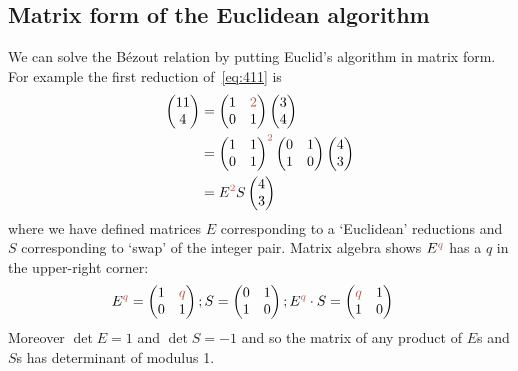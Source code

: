 \subsection{Matrix form of the Euclidean algorithm}
%
We can solve the B\'ezout relation by putting  Euclid's algorithm in matrix form. For example
the first reduction of~\eqref{eq:411} is
\begin{align*}
\begin{pmatrix} 11 \\ 4 \end{pmatrix}  &= \begin{pmatrix} 1 & \jqn{2} \\ 0 & 1\end{pmatrix} \begin{pmatrix} 3 \\ 4\end{pmatrix} 
\\
&
= \begin{pmatrix} 1 &1 \\ 0 & 1\end{pmatrix}^{\jqn{2}}  \begin{pmatrix} 0 & 1  \\ 1 & 0  \end{pmatrix} \begin{pmatrix} 4 \\ 3 \end{pmatrix}
\\
&=
E^{\jqn{2}} S \begin{pmatrix} 4 \\ 3 \end{pmatrix}
\end{align*}
where we have defined matrices  $E$ corresponding to a  `Euclidean' reductions and $S$ corresponding to `swap' of the integer pair. Matrix algebra shows $E^\jq$ has a $q$ in the upper-right corner:
\begin{align*}
	E^{\jq} &=  \begin{pmatrix} 1 & \jq \\ 0 & 1\end{pmatrix}
	;
	S =  \begin{pmatrix} 0 & 1  \\ 1 & 0  \end{pmatrix}
	;
	E^{\jq} \cdot S = \begin{pmatrix}\jq & 1  \\ 1 & 0  \end{pmatrix}
\end{align*}
Moreover  $\det E=1$ and $\det S=-1$ and so the matrix of any product of $E$s and $S$s has determinant of modulus 1. 

